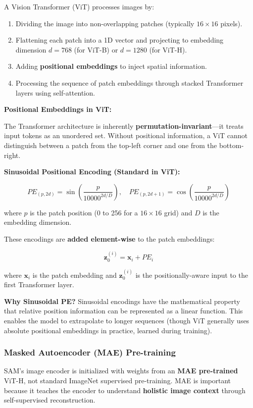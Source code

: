 A Vision Transformer (ViT) processes images by:
\begin{enumerate}
    \item Dividing the image into non-overlapping patches (typically $16 \times 16$ pixels).
    \item Flattening each patch into a 1D vector and projecting to embedding dimension $d = 768$ (for ViT-B) or $d = 1280$ (for ViT-H).
    \item Adding \textbf{positional embeddings} to inject spatial information.
    \item Processing the sequence of patch embeddings through stacked Transformer layers using self-attention.
\end{enumerate}

\textbf{Positional Embeddings in ViT:}

The Transformer architecture is inherently \textbf{permutation-invariant}—it treats input tokens as an unordered set. Without positional information, a ViT cannot distinguish between a patch from the top-left corner and one from the bottom-right.

\textbf{Sinusoidal Positional Encoding (Standard in ViT):}

\[
PE_{(p, 2d)} = \sin\left(\frac{p}{10000^{2d/D}}\right), \quad PE_{(p, 2d+1)} = \cos\left(\frac{p}{10000^{2d/D}}\right)
\]

where $p$ is the patch position (0 to 256 for a $16 \times 16$ grid) and $D$ is the embedding dimension.

These encodings are \textbf{added element-wise} to the patch embeddings:

\[
\mathbf{z}_0^{(i)} = \mathbf{x}_i + PE_i
\]

where $\mathbf{x}_i$ is the patch embedding and $\mathbf{z}_0^{(i)}$ is the positionally-aware input to the first Transformer layer.

\textbf{Why Sinusoidal PE?} Sinusoidal encodings have the mathematical property that relative position information can be represented as a linear function. This enables the model to extrapolate to longer sequences (though ViT generally uses absolute positional embeddings in practice, learned during training).

\subsubsection{Masked Autoencoder (MAE) Pre-training}

SAM's image encoder is initialized with weights from an \textbf{MAE pre-trained} ViT-H, not standard ImageNet supervised pre-training. MAE is important because it teaches the encoder to understand \textbf{holistic image context} through self-supervised reconstruction.

